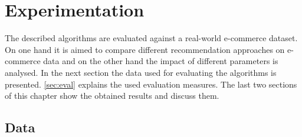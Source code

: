 \documentclass[10pt]{reportMaster}
\begin{document}
\chapter{Experimentation}
\label{chap:experimentation}
The described algorithms are evaluated against a real-world e-commerce dataset.
On one hand it is aimed to compare different recommendation approaches on e-commerce data and on the other hand the impact of different parameters is analysed.
In the next section the data used for evaluating the algorithms is presented.
\ref{sec:eval} explains the used evaluation measures.
The last two sections of this chapter show the obtained results and discuss them.

\section{Data}
\label{sec:data}
\end{document}
